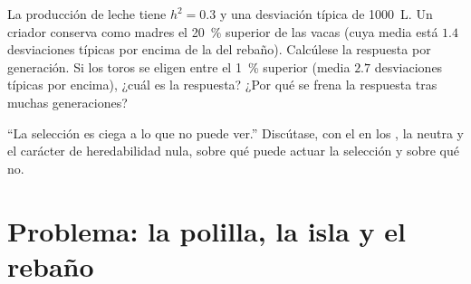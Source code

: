 \begin{exercise}[$\star\star\star$]\label{exo:b2:population-genetics:11}
La producción de leche tiene $h^{2} = 0.3$ y una desviación típica de
\qty{1000}{L}. Un criador conserva como madres el \qty{20}{\%} superior de
las vacas (cuya media está $1.4$ desviaciones típicas por encima de la del
rebaño). Calcúlese la respuesta por generación. Si los toros se eligen
entre el \qty{1}{\%} superior (media $2.7$ desviaciones típicas por
encima), ¿cuál es la respuesta? ¿Por qué se frena la respuesta tras muchas
generaciones?
\end{exercise}

\begin{exercise}[$\star\star\star$]\label{exo:b2:population-genetics:12}
``La selección es ciega a lo que no puede ver.'' Discútase, con el 
 en los , la  neutra y el carácter de
heredabilidad nula, sobre qué puede actuar la selección y sobre qué no.
\end{exercise}

\section{Problema: la polilla, la isla y el rebaño}

